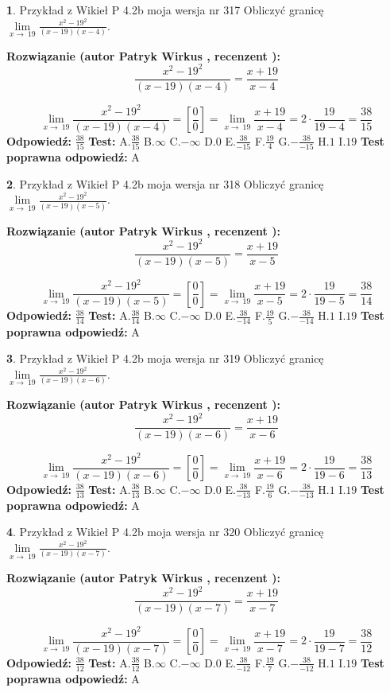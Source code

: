 \documentclass[12pt, a4paper]{article}
\theoremstyle{definition} %
\newtheorem{zad}{}
\newcommand{\zadStart}[1]{\begin{zad}#1\newline}
\newcommand{\zadStop}{\end{zad}}
\newcommand{\rozwStart}[2]{\noindent \textbf{Rozwiązanie (autor #1 , recenzent #2): }\newline}
\newcommand{\rozwStop}{\newline}
\newcommand{\odpStart}{\noindent \textbf{Odpowiedź:}\newline}
\newcommand{\odpStop}{\newline}
\newcommand{\testStart}{\noindent \textbf{Test:}\newline}
\newcommand{\testStop}{\newline}
\newcommand{\kluczStart}{\noindent \textbf{Test poprawna odpowiedź:}\newline}
\newcommand{\kluczStop}{\newline}
\begin{document}
\zadStart{Przykład z Wikieł P 4.2b moja wersja nr 317}
Obliczyć granicę $\lim\limits_{x\to\ 19}\frac{x^{2}-19^{2}}{(x-19)(x-4)}$.
\zadStop
\rozwStart{Patryk Wirkus}{}
$$\frac{x^{2}-19^{2}}{(x-19)(x-4)}=\frac{x+19}{x-4}$$

$$\lim\limits_{x\to\ 19}\frac{x^{2}-19^{2}}{(x-19)(x-4)}=[\frac{0}{0}]=\lim\limits_{x\to\ 19}\frac{x+19}{x-4}=2 \cdot \frac{19}{19-4} = \frac{38}{15}$$
\rozwStop
\odpStart
$\frac{38}{15}$
\odpStop
\testStart
A.$\frac{38}{15}$
B.$\infty$
C.$-\infty$
D.$0$
E.$\frac{38}{-15}$
F.$\frac{19}{4}$
G.$-\frac{38}{-15}$
H.$1$
I.$19$
\testStop
\kluczStart
A
\kluczStop



\zadStart{Przykład z Wikieł P 4.2b moja wersja nr 318}
Obliczyć granicę $\lim\limits_{x\to\ 19}\frac{x^{2}-19^{2}}{(x-19)(x-5)}$.
\zadStop
\rozwStart{Patryk Wirkus}{}
$$\frac{x^{2}-19^{2}}{(x-19)(x-5)}=\frac{x+19}{x-5}$$

$$\lim\limits_{x\to\ 19}\frac{x^{2}-19^{2}}{(x-19)(x-5)}=[\frac{0}{0}]=\lim\limits_{x\to\ 19}\frac{x+19}{x-5}=2 \cdot \frac{19}{19-5} = \frac{38}{14}$$
\rozwStop
\odpStart
$\frac{38}{14}$
\odpStop
\testStart
A.$\frac{38}{14}$
B.$\infty$
C.$-\infty$
D.$0$
E.$\frac{38}{-14}$
F.$\frac{19}{5}$
G.$-\frac{38}{-14}$
H.$1$
I.$19$
\testStop
\kluczStart
A
\kluczStop



\zadStart{Przykład z Wikieł P 4.2b moja wersja nr 319}
Obliczyć granicę $\lim\limits_{x\to\ 19}\frac{x^{2}-19^{2}}{(x-19)(x-6)}$.
\zadStop
\rozwStart{Patryk Wirkus}{}
$$\frac{x^{2}-19^{2}}{(x-19)(x-6)}=\frac{x+19}{x-6}$$

$$\lim\limits_{x\to\ 19}\frac{x^{2}-19^{2}}{(x-19)(x-6)}=[\frac{0}{0}]=\lim\limits_{x\to\ 19}\frac{x+19}{x-6}=2 \cdot \frac{19}{19-6} = \frac{38}{13}$$
\rozwStop
\odpStart
$\frac{38}{13}$
\odpStop
\testStart
A.$\frac{38}{13}$
B.$\infty$
C.$-\infty$
D.$0$
E.$\frac{38}{-13}$
F.$\frac{19}{6}$
G.$-\frac{38}{-13}$
H.$1$
I.$19$
\testStop
\kluczStart
A
\kluczStop



\zadStart{Przykład z Wikieł P 4.2b moja wersja nr 320}
Obliczyć granicę $\lim\limits_{x\to\ 19}\frac{x^{2}-19^{2}}{(x-19)(x-7)}$.
\zadStop
\rozwStart{Patryk Wirkus}{}
$$\frac{x^{2}-19^{2}}{(x-19)(x-7)}=\frac{x+19}{x-7}$$

$$\lim\limits_{x\to\ 19}\frac{x^{2}-19^{2}}{(x-19)(x-7)}=[\frac{0}{0}]=\lim\limits_{x\to\ 19}\frac{x+19}{x-7}=2 \cdot \frac{19}{19-7} = \frac{38}{12}$$
\rozwStop
\odpStart
$\frac{38}{12}$
\odpStop
\testStart
A.$\frac{38}{12}$
B.$\infty$
C.$-\infty$
D.$0$
E.$\frac{38}{-12}$
F.$\frac{19}{7}$
G.$-\frac{38}{-12}$
H.$1$
I.$19$
\testStop
\kluczStart
A
\kluczStop
\end{document}
